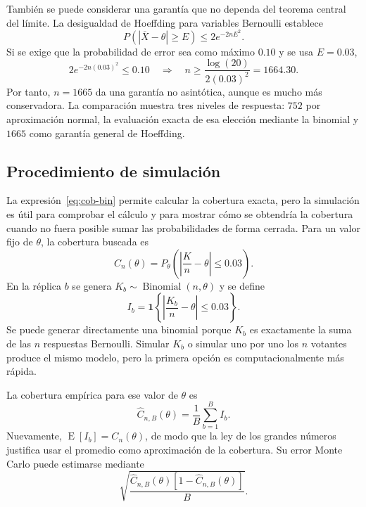 \documentclass[10pt,a4paper,oneside]{article}
\newcommand{\E}{\operatorname{E}}
\newcommand{\ind}{\mathbf{1}}
\begin{document}
También se puede considerar una garantía que no dependa del teorema central del límite. La desigualdad de Hoeffding para variables Bernoulli establece
\begin{equation*}
P(|\overline X-\theta|\geq E)\leq2e^{-2nE^2}.
\end{equation*}
Si se exige que la probabilidad de error sea como máximo $0.10$ y se usa $E=0.03$,
\begin{equation*}
2e^{-2n(0.03)^2}\leq0.10
\quad\Longrightarrow\quad
n\geq\frac{\log(20)}{2(0.03)^2}=1664.30.
\end{equation*}
Por tanto, $n=1665$ da una garantía no asintótica, aunque es mucho más conservadora. La comparación muestra tres niveles de respuesta: $752$ por aproximación normal, la evaluación exacta de esa elección mediante la binomial y $1665$ como garantía general de Hoeffding.

\subsection*{Procedimiento de simulación}

La expresión~\eqref{eq:cob-bin} permite calcular la cobertura exacta, pero la simulación es útil para comprobar el cálculo y para mostrar cómo se obtendría la cobertura cuando no fuera posible sumar las probabilidades de forma cerrada. Para un valor fijo de $\theta$, la cobertura buscada es
\begin{equation*}
C_n(\theta)=P_\theta\!\left(\left|\frac{K}{n}-\theta\right|\leq0.03\right).
\end{equation*}
En la réplica $b$ se genera $K_b\sim\operatorname{Binomial}(n,\theta)$ y se define
\begin{equation*}
I_b=\ind\!\left\{\left|\frac{K_b}{n}-\theta\right|\leq0.03\right\}.
\end{equation*}
Se puede generar directamente una binomial porque $K_b$ es exactamente la suma de las $n$ respuestas Bernoulli. Simular $K_b$ o simular uno por uno los $n$ votantes produce el mismo modelo, pero la primera opción es computacionalmente más rápida.

La cobertura empírica para ese valor de $\theta$ es
\begin{equation*}
\widehat C_{n,B}(\theta)=\frac1B\sum_{b=1}^{B}I_b.
\end{equation*}
Nuevamente, $\E[I_b]=C_n(\theta)$, de modo que la ley de los grandes números justifica usar el promedio como aproximación de la cobertura. Su error Monte Carlo puede estimarse mediante
\begin{equation*}
\sqrt{\frac{\widehat C_{n,B}(\theta)[1-\widehat C_{n,B}(\theta)]}{B}}.
\end{equation*}
\end{document}
